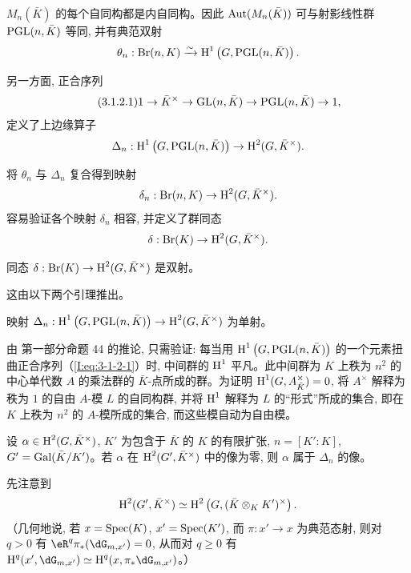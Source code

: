 $M_n(\bar K)$ 的每个自同构都是内自同构。因此 $\operatorname{Aut}(M_n(\bar K))$ 可与射影线性群 $\operatorname{PGL}(n,\bar K)$ 等同, 并有典范双射
\[
  \theta_n : \operatorname{Br}(n,K) \xrightarrow\sim \operatorname{H}^1\left(G,\operatorname{PGL}(n,\bar K)\right)\text{.}
\]

另一方面, 正合序列
\begin{equation*}\tag{3.1.2.1}\label{I:eq:3-1-2-1}
  1 \to \bar K^\times \to \operatorname{GL}(n,\bar K) \to \operatorname{PGL}(n,\bar K) \to 1\text{,}
\end{equation*}
定义了上边缘算子
\[
  \Delta_n : \operatorname{H}^1\left(G,\operatorname{PGL}(n,\bar K)\right) \to \operatorname{H}^2(G,\bar K^\times)\text{.}
\]

将 $\theta_n$ 与 $\Delta_n$ 复合得到映射
\[
  \delta_n : \operatorname{Br}(n,K) \to \operatorname{H}^2(G,\bar K^\times)\text{.}
\]
容易验证各个映射 $\delta_n$ 相容, 并定义了群同态
\[
  \delta : \operatorname{Br}(K) \to \operatorname{H}^2(G,\bar K^\times)\text{.}
\]

\begin{proposition}\label{I:3-1-3}
同态 $\delta:\operatorname{Br}(K)\to\operatorname{H}^2(G,\bar K^\times)$ 是双射。
\end{proposition}

这由以下两个引理推出。

\begin{lemma}\label{I:3-1-4}
映射 $\Delta_n:\operatorname{H}^1\left(G,\operatorname{PGL}(n,\bar K)\right)\to
\operatorname{H}^2(G,\bar K^\times)$ 为单射。
\end{lemma}

由 \cite{se94} 第一部分命题 44 的推论, 只需验证: 每当用 $\operatorname{H}^1\left(G,\operatorname{PGL}(n,\bar K)\right)$ 的一个元素扭曲正合序列（\ref{I:eq:3-1-2-1}）时, 中间群的 $\operatorname{H}^1$ 平凡。此中间群为 $K$ 上秩为 $n^2$ 的中心单代数 $A$ 的乘法群的 $\bar K$-点所成的群。为证明 $\operatorname{H}^1(G,A_{\bar K}^\times)=0$, 将 $A^\times$ 解释为秩为 $1$ 的自由 $A$-模 $L$ 的自同构群, 并将 $\operatorname{H}^1$ 解释为 $L$ 的“形式”所成的集合, 即在 $K$ 上秩为 $n^2$ 的 $A$-模所成的集合, 而这些模自动为自由模。

\begin{lemma}\label{I:3-1-5}
设 $\alpha\in\operatorname{H}^2(G,\bar K^\times)$, $K'$ 为包含于 $\bar K$ 的 $K$ 的有限扩张, $n=[K':K]$, $G'=\operatorname{Gal}(\bar K/K')$。若 $\alpha$ 在 $\operatorname{H}^2(G',\bar K^\times)$ 中的像为零, 则 $\alpha$ 属于 $\Delta_n$ 的像。
\end{lemma}

先注意到
\[
  \operatorname{H}^2(G',\bar K^\times) \simeq \operatorname{H}^2\left(G,(\bar K\otimes_K K')^\times\right)\text{.}
\]
（几何地说, 若 $x=\operatorname{Spec}(K)$, $x'=\operatorname{Spec}(K')$, 而 $\pi:x'\to x$ 为典范态射, 则对 $q>0$ 有 $\eR^q\pi_*(\dG_{m,x'})=0$, 从而对 $q\geqslant0$ 有 $\h^q(x',\dG_{m,x'})\simeq\h^q(x,\pi_*\dG_{m,x'})$。）


